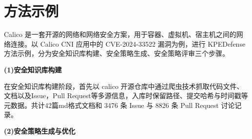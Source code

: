 \section{方法示例}

Calico 是一套开源的网络和网络安全方案，用于容器、虚拟机、宿主机之间的网络连接。以 Calico CNI 应用中的 \mbox{CVE{-}2024{-}33522} 漏洞为例，进行 KPEDefense 方法示例，分为安全知识库构建、安全策略生成、安全策略评审三个步骤。

\noindent\textbf{(1)安全知识库构建}

在安全知识库构建阶段，首先以 calico 开源仓库中通过爬虫技术抓取代码文件、文档以及Issue，Pull Request等多源信息，入库时保留路径、提交哈希与时间戳等元数据。共计42篇md格式文档和 3476 条 Issue 与 8826 条 Pull Request 讨论记录。

\noindent\textbf{(2)安全策略生成与优化}

